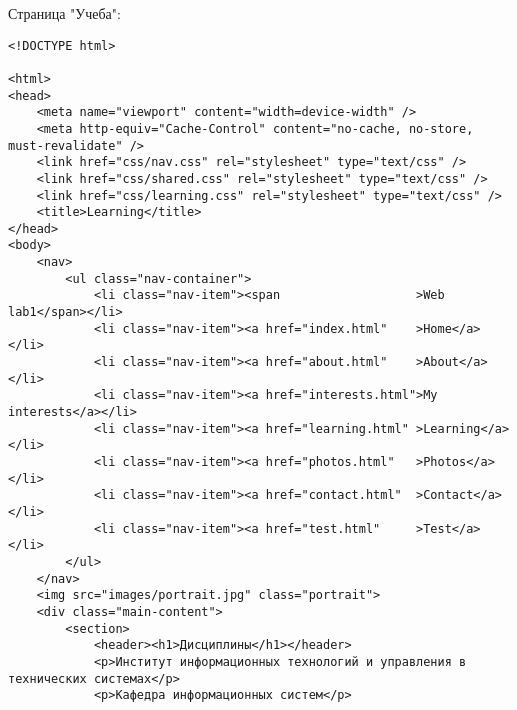 Страница "Учеба":
\begin{lstlisting}
<!DOCTYPE html>

<html>
<head>
    <meta name="viewport" content="width=device-width" />
    <meta http-equiv="Cache-Control" content="no-cache, no-store, must-revalidate" />
    <link href="css/nav.css" rel="stylesheet" type="text/css" />
    <link href="css/shared.css" rel="stylesheet" type="text/css" />
    <link href="css/learning.css" rel="stylesheet" type="text/css" />
    <title>Learning</title>
</head>
<body>
    <nav>
        <ul class="nav-container">
            <li class="nav-item"><span                   >Web lab1</span></li>
            <li class="nav-item"><a href="index.html"    >Home</a></li>
            <li class="nav-item"><a href="about.html"    >About</a></li>
            <li class="nav-item"><a href="interests.html">My interests</a></li>
            <li class="nav-item"><a href="learning.html" >Learning</a></li>
            <li class="nav-item"><a href="photos.html"   >Photos</a></li>
            <li class="nav-item"><a href="contact.html"  >Contact</a></li>
            <li class="nav-item"><a href="test.html"     >Test</a></li>
        </ul>
    </nav>
    <img src="images/portrait.jpg" class="portrait">
    <div class="main-content">
        <section>
            <header><h1>Дисциплины</h1></header>
            <p>Институт информационных технологий и управления в технических системах</p>
            <p>Кафедра информационных систем</p>


\end{lstlisting}
